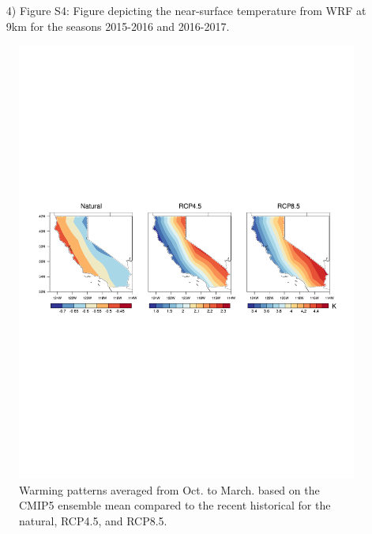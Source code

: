 \documentclass[draft,grl]{agutexSI}
\begin{document}
\begin{article}
\begin{itemize}
\item[4)]  Figure S4: Figure depicting the near-surface temperature from WRF at 9km for the seasons 2015-2016 and 2016-2017.

\end{itemize}


%
%


%

%
%
\end{article}
\clearpage


\begin{figure}
\begin{center}
\includegraphics[width=6in]{FigS1.pdf}
\caption{Warming patterns averaged from Oct. to March. based on the CMIP5 ensemble mean compared to the recent historical for the natural, RCP4.5, and RCP8.5.}
\end{center}
\end{figure}
\end{document}
